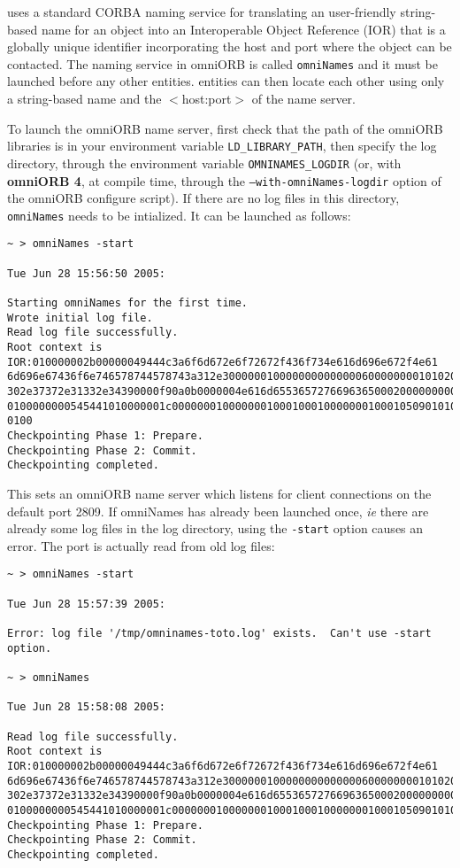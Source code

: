 \diet uses a standard CORBA naming service for translating an
user-friendly string-based name for an object into an Interoperable
Object Reference (IOR) that is a globally unique identifier
incorporating the host and port where the object can be contacted.
The naming service in omniORB is called \texttt{omniNames} and it
must be launched before any other \diet entities.  \diet entities can
then locate each other using only a string-based name and the
$<$host:port$>$ of the name server.

To launch the omniORB name server, first check that the path of the omniORB
libraries is in your environment variable \texttt{LD\_LIBRARY\_PATH}, then
specify the log directory, through the environment variable
\texttt{OMNINAMES\_LOGDIR} (or, with \textbf{omniORB 4}, at compile time,
through the \texttt{--with-omniNames-logdir} option of the omniORB configure
script). If there are no log files in this directory,
\texttt{omniNames} needs to be intialized. It can be launched as
follows: 
{\footnotesize
\begin{verbatim}
~ > omniNames -start

Tue Jun 28 15:56:50 2005:

Starting omniNames for the first time.
Wrote initial log file.
Read log file successfully.
Root context is IOR:010000002b00000049444c3a6f6d672e6f72672f436f734e616d696e672f4e61
6d696e67436f6e746578744578743a312e300000010000000000000060000000010102000d0000003134
302e37372e31332e34390000f90a0b0000004e616d655365727669636500020000000000000008000000
0100000000545441010000001c0000000100000001000100010000000100010509010100010000000901
0100
Checkpointing Phase 1: Prepare.
Checkpointing Phase 2: Commit.
Checkpointing completed.
\end{verbatim}
}

This sets an omniORB name server which listens for client connections
on the default port 2809. If omniNames has already been launched once,
\emph{ie} there are already some log files in the log directory, using
the \texttt{-start} option causes an error. The port is actually read
from old log files: {\footnotesize
\begin{verbatim}
~ > omniNames -start

Tue Jun 28 15:57:39 2005:

Error: log file '/tmp/omninames-toto.log' exists.  Can't use -start option.

~ > omniNames  

Tue Jun 28 15:58:08 2005:

Read log file successfully.
Root context is IOR:010000002b00000049444c3a6f6d672e6f72672f436f734e616d696e672f4e61
6d696e67436f6e746578744578743a312e300000010000000000000060000000010102000d0000003134
302e37372e31332e34390000f90a0b0000004e616d655365727669636500020000000000000008000000
0100000000545441010000001c0000000100000001000100010000000100010509010100010000000901
Checkpointing Phase 1: Prepare.
Checkpointing Phase 2: Commit.
Checkpointing completed.
\end{verbatim}
}

